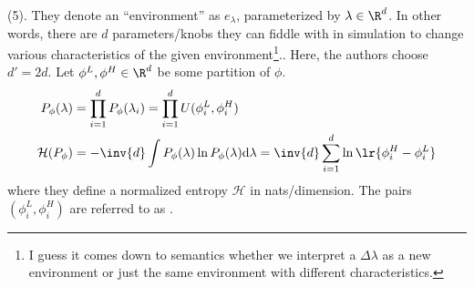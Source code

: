 \documentclass[11pt]{article}
\begin{document}
 (5). They denote an ``environment'' as $e_{\lambda}$, parameterized by $\lambda \in \R^d$. In other words, there are $d$ parameters/knobs they can fiddle with in simulation to change various characteristics of the given environment\footnote{I guess it comes down to semantics whether we interpret a $\Delta \lambda$ as a new environment or just the same environment with different characteristics.}.. Here, the authors choose $d' = 2d$. Let $\phi^L, \phi^H \in \R^d$ be some partition of $\phi$.
\begin{align}
	P_{\phi}(\lambda)
		&= \prod_{i=1}^{d} P_{\phi}(\lambda_i) = \prod_{i=1}^{d} U(\phi_i^L, \phi_i^H) \\
	\mathcal H(P_{\phi})
		&= - \inv{d} \int P_{\phi}(\lambda) \ln P_{\phi}(\lambda) \mathrm{d} \lambda
		= \inv{d} \sum_{i=1}^d \ln \lr{ \phi_i^H - \phi_i^L }
\end{align}
where they define a normalized entropy $\mathcal H$ in nats/dimension. The pairs $(\phi_i^L, \phi_i^H)$ are referred to as . 
\end{document}

